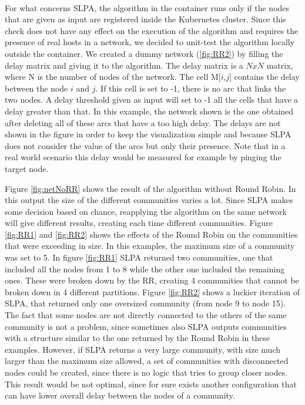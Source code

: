 \paragraph{}
For what concerns SLPA, the algorithm in the container runs only if the nodes that
are given as input are registered inside the Kubernetes cluster. Since this check does not have
any effect on the execution of the algorithm and requires the presence of real hosts in a network,
we decided to unit-test the algorithm locally outside the container.
We created a dummy network (\ref{fig:RR2}) by filling the delay matrix and giving it to the algorithm.
The delay matrix is a  $NxN$ matrix, where N is the number of nodes of the network.
The cell M[$i$,$j$] contains the delay between the node $i$ and $j$. If this
cell is set to -1, there is no arc that links the two nodes. A delay threshold given as input will set to -1
all the cells that have a delay greater than that. In this example, the network shown is the one obtained after 
deleting all of these arcs that have a too high delay. The delays are not shown in the figure in order
to keep the visualization simple and because SLPA does not consider the value of the arcs but only their presence.
Note that in a real world scenario this delay would be measured for example by pinging the target node.
\par
Figure \ref{fig:netNoRR} shows the result of the algorithm without Round Robin. In this output the size of the 
different communities varies a lot. Since SLPA makes some decision based on chance, reapplying the
algorithm on the same network will give different results, creating each time different communities.
Figure \ref{fig:RR1} and \ref{fig:RR2} shows the effects of the Round Robin on the communities that were exceeding 
in size. In this examples, the maximum size of a community was set to 5. In figure \ref{fig:RR1} SLPA returned
two communities, one that included all the nodes from 1 to 8 while the other one included the remaining ones.
These were broken down  by the RR, creating 4 communities that cannot be broken down in 4 different partitions.
Figure \ref{fig:RR2} shows a luckier iteration of SLPA, that returned only one oversized community (from node 9
to node 15). 
\\
The fact that some nodes are not directly connected to the others of the same community is not a problem,
since sometimes also SLPA outputs communities with a structure similar to the one returned by the Round Robin in these examples.
However, if SLPA returns a very large community, with size much larger than the maximum size allowed, a set of communities
with disconnected nodes could be created, since there is no logic that tries to group closer nodes.
This result would be not optimal, since for sure exists another configuration that can have lower
overall delay between the nodes of a community.


